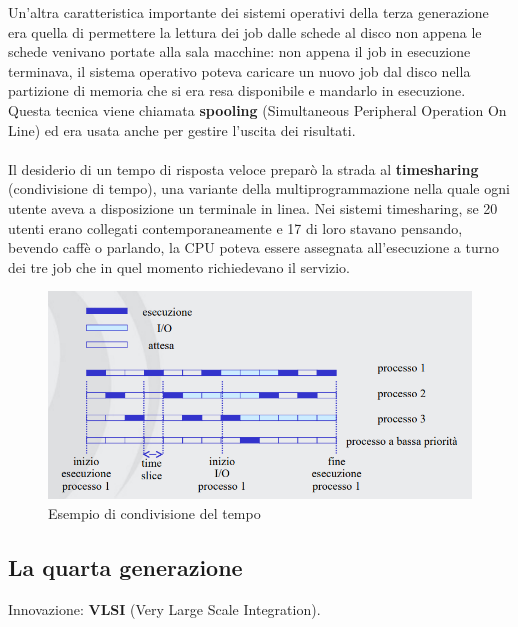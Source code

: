 Un'altra caratteristica importante dei sistemi operativi della terza generazione era quella di permettere la lettura dei job dalle schede al disco non appena le schede venivano portate alla sala macchine: non appena il job in esecuzione terminava, il sistema operativo poteva caricare un nuovo job dal disco nella partizione di memoria che si era resa disponibile e mandarlo in esecuzione. Questa tecnica viene chiamata \textbf{spooling} (Simultaneous Peripheral Operation On Line) ed era usata anche per gestire l'uscita dei risultati.

\paragraph*{}
Il desiderio di un tempo di risposta veloce preparò la strada al \textbf{timesharing} (condivisione di tempo), una variante della multiprogrammazione nella quale ogni utente aveva a disposizione un terminale in linea. Nei sistemi timesharing, se 20 utenti erano collegati contemporaneamente e 17 di loro stavano pensando, bevendo caffè o parlando, la CPU poteva essere assegnata all'esecuzione a turno dei tre job che in quel momento richiedevano il servizio.

\begin{figure}[h!]
    \centering
    \includegraphics[width=0.7\linewidth]{assets/timesharing1.png}
    \caption{Esempio di condivisione del tempo}
\end{figure}

\paragraph*{}
\paragraph*{}
\subsection{La quarta generazione}

Innovazione: \textbf{VLSI} (Very Large Scale Integration).

